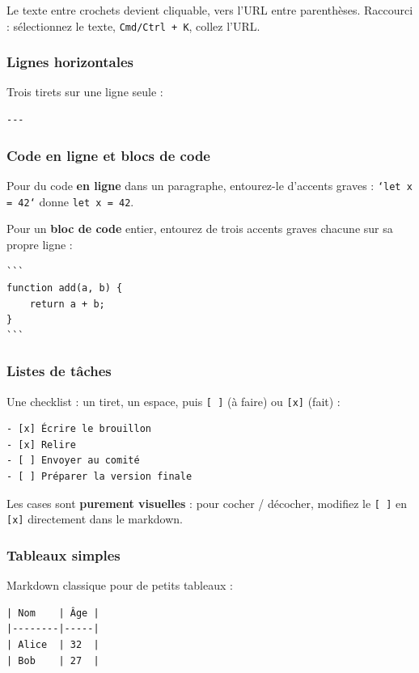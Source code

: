 \documentclass[11pt,a4paper]{article}
\theoremstyle{definition}
\begin{document}
Le texte entre crochets devient cliquable, vers l'URL entre
parenthèses. Raccourci : sélectionnez le texte, \texttt{Cmd/Ctrl + K},
collez l'URL.


\subsubsection{Lignes horizontales}

Trois tirets sur une ligne seule :


\begin{lstlisting}
---
\end{lstlisting}


\subsubsection{Code en ligne et blocs de code}

Pour du code \textbf{en ligne} dans un paragraphe, entourez-le d'accents
graves : \texttt{`let x = 42`} donne \texttt{let x = 42}.


Pour un \textbf{bloc de code} entier, entourez de trois accents graves
chacune sur sa propre ligne :


\begin{lstlisting}
```
function add(a, b) {
    return a + b;
}
```
\end{lstlisting}


\subsubsection{Listes de tâches}

Une checklist : un tiret, un espace, puis \texttt{[ ]} (à faire) ou \texttt{[x]}
(fait) :


\begin{lstlisting}
- [x] Écrire le brouillon
- [x] Relire
- [ ] Envoyer au comité
- [ ] Préparer la version finale
\end{lstlisting}


Les cases sont \textbf{purement visuelles} : pour cocher / décocher,
modifiez le \texttt{[ ]} en \texttt{[x]} directement dans le markdown.


\subsubsection{Tableaux simples}

Markdown classique pour de petits tableaux :


\begin{lstlisting}
| Nom    | Âge |
|--------|-----|
| Alice  | 32  |
| Bob    | 27  |
\end{lstlisting}
\end{document}
